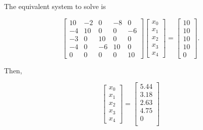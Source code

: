 The equivalent system to solve is

\[ \left[ \begin{array}{ccccc}
    10 & -2 & 0 & -8 & 0\\
    -4 & 10 & 0 & 0 & -6\\
    -3 & 0 & 10 & 0 & 0\\
    -4 & 0 & -6 & 10 & 0\\
    0 & 0 & 0 & 0 & 10
\end{array} \right] 
\left[ \begin{array}{c}
    x_0\\
    x_1\\
    x_2\\
    x_3\\
    x_4
\end{array} \right]
= 
\left[ \begin{array}{c}
    10\\
    10\\
    10\\
    10\\
    0
\end{array} \right].
\]

Then,

\[ \left[ \begin{array}{c}
    x_0\\
    x_1\\
    x_2\\
    x_3\\
    x_4
\end{array} \right]
= 
\left[ \begin{array}{c}
    5.44\\
    3.18\\
    2.63\\
    4.75\\
    0\\
\end{array} \right] \]
